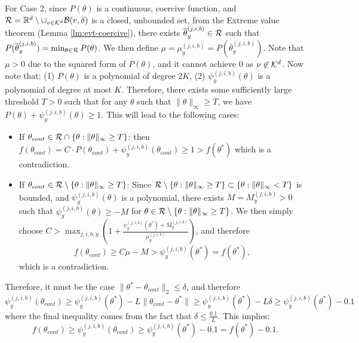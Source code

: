         For Case 2, since $P(\theta)$ is a continuous, coercive function, and $\mathcal{R} = \mathbb{R}^d \setminus \cup_{v \in \mathcal{K}^d}\mathcal{B}(v, \delta)$ is a closed, unbounded set, from the Extreme value theorem (Lemma \ref{lm:evt-coercive}), there exists $\overline{\theta}^{(j, i, b)}_{y} \in \mathcal{R}$ such that $P(\overline{\theta}^{(j, i, b)}_{y} ) = \min_{\theta \in \mathcal{R}} P(\theta)$. We then define $\mu = \mu^{(j, i, b)}_{y} = P(\overline{\theta}^{(j, i, b)}_{y} )$. Note that $\mu > 0$ due to the squared form of $P(\theta)$, and it cannot achieve $0$ as $\nu \not \in \mathcal{K}^d$. Now note that: (1) $P(\theta)$ is a polynomial of degree $2K$, (2) $\psi^{(j, i, b)}_{y}(\theta)$ is a polynomial of degree at most $K$. Therefore, there exists some sufficiently large threshold $T > 0$ such that for any $\theta$ such that $\|\theta\|_\infty \geq T$, we have $P(\theta) + \psi^{(j, i, b)}_{y}(\theta) \geq 1$. This will lead to the following cases:
        \begin{itemize}
            \item If $\theta_{cont} \in \mathcal{R} \cap \{\theta: \|\theta\|_\infty \geq T\}$: then $f(\theta_{cont}) = C\cdot P(\theta_{cont}) + \psi^{(j, i, b)}_{y}(\theta_{cont}) \geq 1 > f(\theta^*)$ which is a contradiction.
            \item If $\theta_{cont} \in \mathcal{R} \setminus \{\theta: \|\theta\|_\infty \geq T\}$: Since $\mathcal{R} \setminus \{\theta: \|\theta\|_\infty \geq T\} \subset \{\theta: \|\theta\|_\infty < T\}$ is bounded, and $\psi^{(j, i, b)}_{y}(\theta)$ is a polynomial, there exists $M = M^{(j, i, b)}_y > 0$ such that $\psi^{(j, i, b)}_{y}(\theta) \geq -M$ for $\theta \in \mathcal{R} \setminus \{\theta: \|\theta\|_\infty \geq T\}$. We then simply choose $C > \max_{j, i, b, y}\left(1 + \frac{\psi^{(j, i, b)}_{y}(\theta^*) +  M^{(j, i, b)}_y}{\mu^{(j, i, b)}_{y}}\right)$, and therefore
            \[
                f(\theta_{cont}) \geq C\mu - M > \psi^{(j, i, b)}_{y}(\theta^*) = f(\theta^*),
            \]
            which is a contradiction.
        \end{itemize}
    
        Therefore, it must be the case $\|\theta^* - \theta_{cont}\|_2 \leq \delta$, and therefore
        \[
            \psi^{(j, i, b)}_{y}(\theta_{cont}) \geq \psi^{(j, i, b)}_{y}(\theta^*) - L\|\theta_{cont} - \theta^*\| \geq \psi^{(j, i, b)}_{y}(\theta^*)  - L\delta \geq \psi^{(j, i, b)}_{y}(\theta^*) - 0.1
        \]
        where the final inequality comes from the fact that $\delta \leq \frac{0.1}{L}$. This implies:
        \[
            f(\theta_{cont}) \geq \psi^{(j, i, b)}_{y}(\theta_{cont}) \geq \psi^{(j, i, b)}_{y}(\theta^*) - 0.1 = f(\theta^*) - 0.1.
        \]

